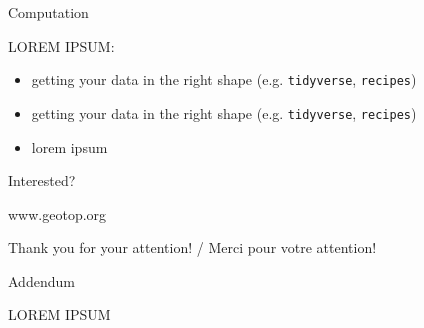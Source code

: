 \documentclass[ignorenonframetext,]{beamer}
\begin{document}
\begin{frame}[fragile]{Computation}
\protect\hypertarget{computation}{}

LOREM IPSUM:

\begin{itemize}
\item
  getting your data in the right shape (e.g. \texttt{tidyverse},
  \texttt{recipes})
\item
  getting your data in the right shape (e.g. \texttt{tidyverse},
  \texttt{recipes})
\item
  lorem ipsum
\end{itemize}

\end{frame}

\begin{frame}{Interested?}
\protect\hypertarget{interested}{}

www.geotop.org

Thank you for your attention! / Merci pour votre attention!

\end{frame}

\begin{frame}{Addendum}
\protect\hypertarget{addendum}{}

LOREM IPSUM

\end{frame}
\end{document}
